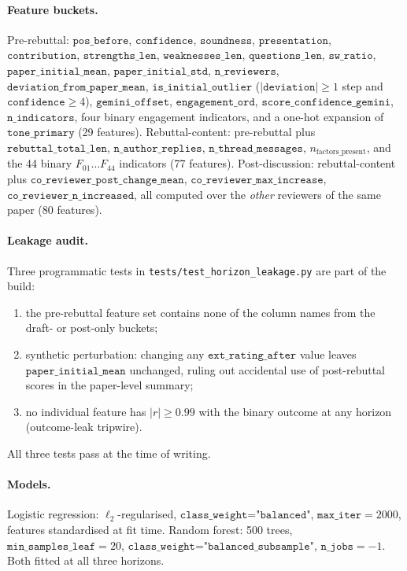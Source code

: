 \documentclass{article}
\newcommand{\code}[1]{\texttt{#1}}
\begin{document}
\paragraph{Feature buckets.} Pre-rebuttal: $\code{pos\_before}$, $\code{confidence}$, $\code{soundness}$, $\code{presentation}$, $\code{contribution}$, $\code{strengths\_len}$, $\code{weaknesses\_len}$, $\code{questions\_len}$, $\code{sw\_ratio}$, $\code{paper\_initial\_mean}$, $\code{paper\_initial\_std}$, $\code{n\_reviewers}$, $\code{deviation\_from\_paper\_mean}$, $\code{is\_initial\_outlier}$ ($|\code{deviation}| \ge 1$ step and $\code{confidence} \ge 4$), $\code{gemini\_offset}$, $\code{engagement\_ord}$, $\code{score\_confidence\_gemini}$, $\code{n\_indicators}$, four binary engagement indicators, and a one-hot expansion of $\code{tone\_primary}$ (29 features). Rebuttal-content: pre-rebuttal plus $\code{rebuttal\_total\_len}$, $\code{n\_author\_replies}$, $\code{n\_thread\_messages}$, $n_{\text{factors\_present}}$, and the 44 binary $F_{01}\ldots F_{44}$ indicators (77 features). Post-discussion: rebuttal-content plus $\code{co\_reviewer\_post\_change\_mean}$, $\code{co\_reviewer\_max\_increase}$, $\code{co\_reviewer\_n\_increased}$, all computed over the \emph{other} reviewers of the same paper (80 features).

\paragraph{Leakage audit.} Three programmatic tests in \code{tests/test\_horizon\_leakage.py} are part of the build:
\begin{enumerate}[itemsep=0pt,topsep=2pt]
  \item the pre-rebuttal feature set contains none of the column names from the draft- or post-only buckets;
  \item synthetic perturbation: changing any $\code{ext\_rating\_after}$ value leaves $\code{paper\_initial\_mean}$ unchanged, ruling out accidental use of post-rebuttal scores in the paper-level summary;
  \item no individual feature has $\lvert r \rvert \ge 0.99$ with the binary outcome at any horizon (outcome-leak tripwire).
\end{enumerate}
All three tests pass at the time of writing.

\paragraph{Models.} Logistic regression: $\ell_2$-regularised, $\code{class\_weight="balanced"}$, $\code{max\_iter}=2000$, features standardised at fit time. Random forest: 500 trees, $\code{min\_samples\_leaf}=20$, $\code{class\_weight="balanced\_subsample"}$, $\code{n\_jobs}=-1$. Both fitted at all three horizons.
\end{document}
